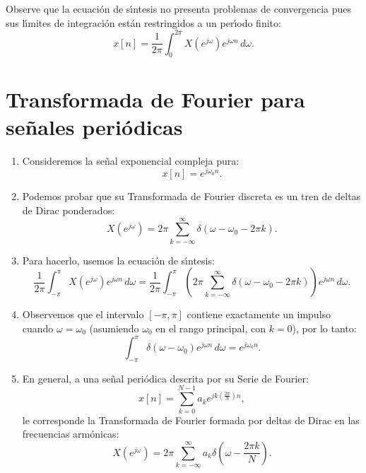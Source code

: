 \documentclass[11pt,a4paper,openany]{book}
\begin{document}
Observe que la ecuaci\'{o}n de s\'{\i}ntesis no presenta problemas de convergencia pues sus l\'{\i}mites de integraci\'{o}n est\'{a}n restringidos a un per\'{\i}odo finito:
\begin{equation}
	x[n] = \frac{1}{2\pi} \int_{0}^{2\pi} X(e^{j\omega}) e^{j\omega n} \, d\omega.
\end{equation}

\section{Transformada de Fourier para se\~{n}ales peri\'{o}dicas}

\begin{enumerate}
	\item Consideremos la se\~{n}al exponencial compleja pura:
	\begin{equation}
		x[n] = e^{j\omega_{0}n}.
	\end{equation}
	
	\item Podemos probar que su Transformada de Fourier discreta es un tren de deltas de Dirac ponderados:
	\begin{equation}
		X(e^{j\omega}) = 2\pi \sum_{k=-\infty}^{\infty} \delta(\omega - \omega_{0} - 2\pi k).
	\end{equation}
	
	\item Para hacerlo, usemos la ecuaci\'{o}n de s\'{\i}ntesis:
	\begin{equation}
		\frac{1}{2\pi} \int_{-\pi}^{\pi} X(e^{j\omega}) e^{j\omega n} \, d\omega = \frac{1}{2\pi} \int_{-\pi}^{\pi} \left( 2\pi \sum_{k=-\infty}^{\infty} \delta(\omega - \omega_{0} - 2\pi k) \right) e^{j\omega n} \, d\omega.
	\end{equation}
	
	\item Observemos que el intervalo $[-\pi, \pi]$ contiene exactamente un impulso cuando $\omega = \omega_{0}$ (asumiendo $\omega_0$ en el rango principal, con $k=0$), por lo tanto:
	\begin{equation}
		\int_{-\pi}^{\pi} \delta(\omega - \omega_{0}) e^{j\omega n} \, d\omega = e^{j\omega_{0}n}.
	\end{equation}
	
	\item En general, a una se\~{n}al peri\'{o}dica descrita por su Serie de Fourier:
	\begin{equation}
		x[n] = \sum_{k=0}^{N-1} a_{k} e^{jk\left(\frac{2\pi}{N}\right)n},
	\end{equation}
	le corresponde la Transformada de Fourier formada por deltas de Dirac en las frecuencias armónicas:
	\begin{equation}
		X(e^{j\omega}) = 2\pi \sum_{k=-\infty}^{\infty} a_{k} \delta\left(\omega - \frac{2\pi k}{N}\right).
		\label{tfdperiodica}
	\end{equation}
	

\end{enumerate}
\end{document}
